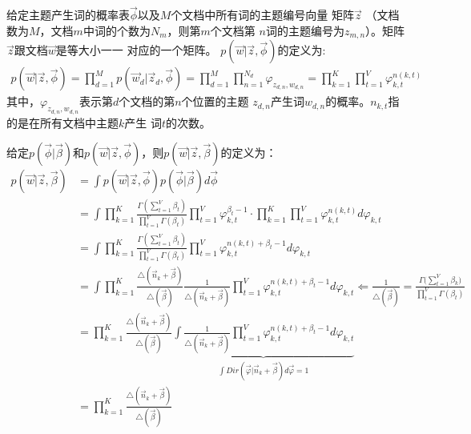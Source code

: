 给定主题产生词的概率表$\vec{\phi}$以及$M$个文档中所有词的主题编号向量
矩阵$\vec{z}$ （文档数为$M$，文档$m$中词的个数为$N_m$，则第$m$个文档第
$n$词的主题编号为$z_{m,n}$）。矩阵$\vec{z}$跟文档$\vec{w}$是等大小一一
对应的一个矩阵。 $p(\vec{w}|\vec{z},\vec{\phi})$的定义为:
\begin{displaymath}
\begin{split}
p(\vec{w}|\vec{z},\vec{\phi}) 
=\prod_{d=1}^{M}{p(\vec{w}_d|\vec{z}_d, \vec{\phi})} 
=\prod_{d=1}^{M}{\prod_{n=1}^{N_d}{\varphi_{z_{d,n},w_{d,n}}}} 
=\prod_{k=1}^{K}{\prod_{t=1}^{V}{\varphi_{k,t}^{n(k,t)}}}
\end{split}
\end{displaymath}
其中，$\varphi_{z_{d,n},w_{d,n}}$表示第$d$个文档的第$n$个位置的主题
$z_{d,n}$产生词$w_{d,n}$的概率。$n_{k,t}$指的是在所有文档中主题$k$产生
词$t$的次数。

给定$p(\vec{\phi}|\vec{\beta})$和$p(\vec{w}|\vec{z},\vec{\phi})$，则$p(\vec{w}|\vec{z},\vec{\beta})$的定义为：
\begin{displaymath}
\begin{split}
p(\vec{w}|\vec{z},\vec{\beta}) &=
\int{p(\vec{w}|\vec{z},\vec{\phi})p(\vec{\phi}|\vec{\beta})d\vec{\phi}} \\
&= \int{
\prod_{k=1}^{K}{\frac{\Gamma(\sum_{t=1}^{V}{\beta_t})}{\prod_{t=1}^{V}{\Gamma(\beta_t)}}\prod_{t=1}^{V}{\varphi_{k,t}^{\beta_t-1}}}
\cdot
\prod_{k=1}^{K}{\prod_{t=1}^{V}{\varphi_{k,t}^{n(k,t)}}}
d\varphi_{k,t}} \\
&= \int{
\prod_{k=1}^{K}{
    \frac{\Gamma(\sum_{t=1}^{V}{\beta_t})}{\prod_{t=1}^{V}{\Gamma(\beta_t)}}
    \prod_{t=1}^{V}{\varphi_{k,t}^{n(k,t)+\beta_t-1}}
}
d\varphi_{k,t}} \\
&= \int{
\prod_{k=1}^{K}{
    \frac{\triangle(\vec{n}_k+\vec{\beta})}{\triangle(\vec{\beta})}
    \frac{1}{\triangle(\vec{n}_k+\vec{\beta})}
    \prod_{t=1}^{V}{\varphi_{k,t}^{n(k,t)+\beta_t-1}}
}
d\varphi_{k,t}} \Longleftarrow \frac{1}{\triangle(\vec{\beta})}=\frac{\Gamma{(\sum_{t=1}^{V}{\beta_k}})}{\prod_{t=1}^{V}{\Gamma{(\beta_t)}}} \\
&= \prod_{k=1}^{K}{
   \frac{\triangle(\vec{n}_k+\vec{\beta})}{\triangle(\vec{\beta})}
   \underbrace{
   \int{
       \frac{1}{\triangle(\vec{n}_k+\vec{\beta})}
      \prod_{t=1}^{V}{\varphi_{k,t}^{n(k,t)+\beta_t-1}}
    d\varphi_{k,t}}
   }_{\int{Dir(\vec{\varphi}|\vec{n}_k + \vec{\beta})d\vec{\varphi}}=1}
}\\
&= \prod_{k=1}^{K}{ \frac{\triangle(\vec{n}_k+\vec{\beta})}{\triangle(\vec{\beta})}}\\
\end{split}
\end{displaymath} 


